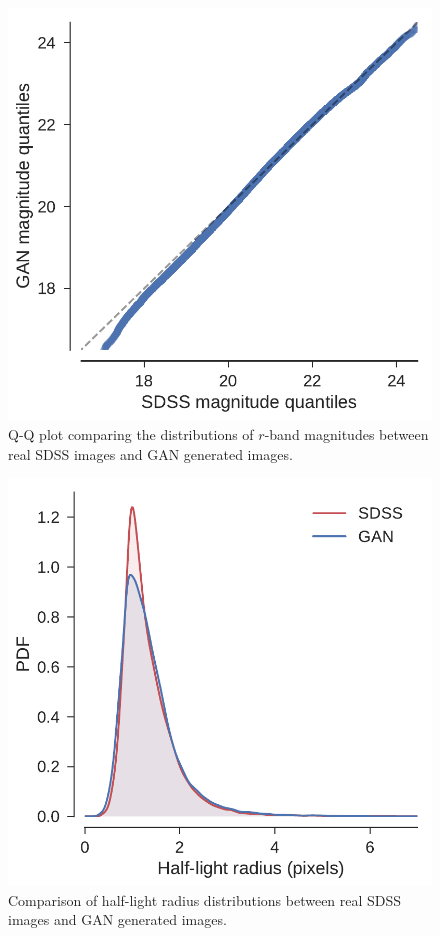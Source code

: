\documentclass[fleqn,usenatbib]{mnras}
\begin{document}
\begin{figure}
  \centering
  \includegraphics[width=\columnwidth]{figures/mag_qq.pdf}
  \caption{Q-Q plot comparing the distributions of $r$-band magnitudes between real SDSS images and GAN generated images.}
  \label{fig:mag_qq}
\end{figure}

\begin{figure}
  \centering
  \includegraphics[width=\columnwidth]{figures/size_kde.pdf}
  \caption{Comparison of half-light radius distributions between real SDSS images and GAN generated images.}
  \label{fig:size_kde}
\end{figure}
\end{document}
